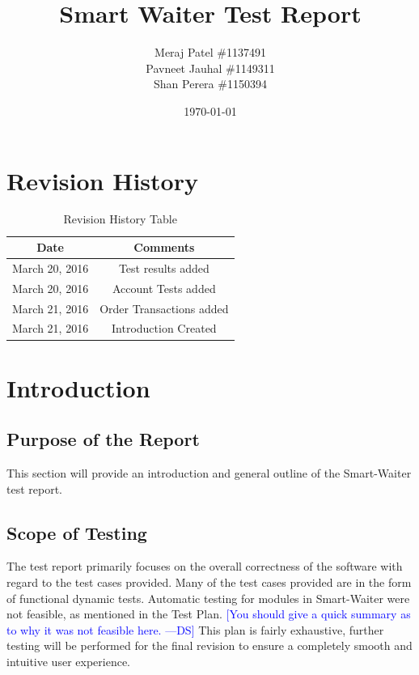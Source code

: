 \documentclass[12pt, titlepage]{article}
\newcommand{\authornote}[3]{\textcolor{#1}{[#3 ---#2]}}
\newcommand{\authornote}[3]{}
\newcommand{\ds}[1]{\authornote{blue}{DS}{#1}}
\begin{document}
\title{Smart Waiter Test Report} 
\author{Meraj Patel \#1137491 \\ Pavneet Jauhal \#1149311\\ Shan Perera \#1150394}
\date{\today}
\maketitle

\tableofcontents 

\listoftables

\begin{table}[H]
\section*{Revision History}
\begin{tabular}{|c|c|}
\hline
\textbf{Date}  & \textbf{Comments} \\ \hline
March 20, 2016 & Test results added \\
\hline
March 20, 2016 & Account Tests added \\
\hline
March 21, 2016 & Order Transactions added \\
\hline
March 21, 2016 & Introduction Created \\
\hline
\end{tabular}
\caption{Revision History Table}
\end{table}

\section{Introduction}
\subsection{Purpose of the Report}
This section will provide an introduction and general outline of the Smart-Waiter test report. 

\subsection{Scope of Testing}
The test report primarily focuses on the overall correctness of the software with regard to the test cases provided. Many of the test cases provided are in the form of functional dynamic tests. Automatic testing for modules in Smart-Waiter were not feasible, as mentioned in the Test Plan.
\ds{You should give a quick summary as to why it was not feasible here.}
This plan is fairly exhaustive, further testing will be performed for the final revision to ensure a completely smooth and intuitive user experience.
\end{document}
